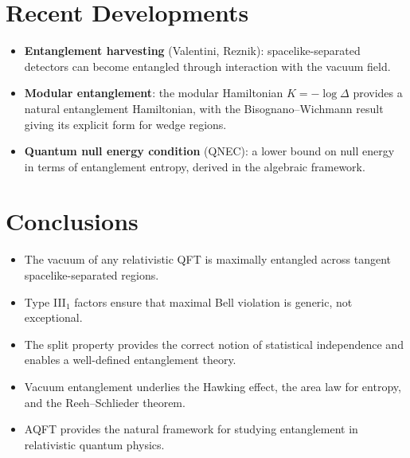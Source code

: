 \documentclass[11pt,a4paper]{article}
\begin{document}
\section{Recent Developments}

\begin{itemize}[nosep]
  \item \textbf{Entanglement harvesting} (Valentini, Reznik): spacelike-separated
        detectors can become entangled through interaction with the vacuum field.
  \item \textbf{Modular entanglement}: the modular Hamiltonian
        $K = -\log\Delta$ provides a natural entanglement Hamiltonian,
        with the Bisognano--Wichmann result giving its explicit form
        for wedge regions.
  \item \textbf{Quantum null energy condition} (QNEC): a lower bound on
        null energy in terms of entanglement entropy, derived in the
        algebraic framework.
\end{itemize}

\section{Conclusions}

\begin{itemize}[nosep]
  \item The vacuum of any relativistic QFT is maximally entangled across
        tangent spacelike-separated regions.
  \item Type III$_1$ factors ensure that maximal Bell violation is generic,
        not exceptional.
  \item The split property provides the correct notion of statistical
        independence and enables a well-defined entanglement theory.
  \item Vacuum entanglement underlies the Hawking effect, the area law for
        entropy, and the Reeh--Schlieder theorem.
  \item AQFT provides the natural framework for studying entanglement in
        relativistic quantum physics.
\end{itemize}
\end{document}
